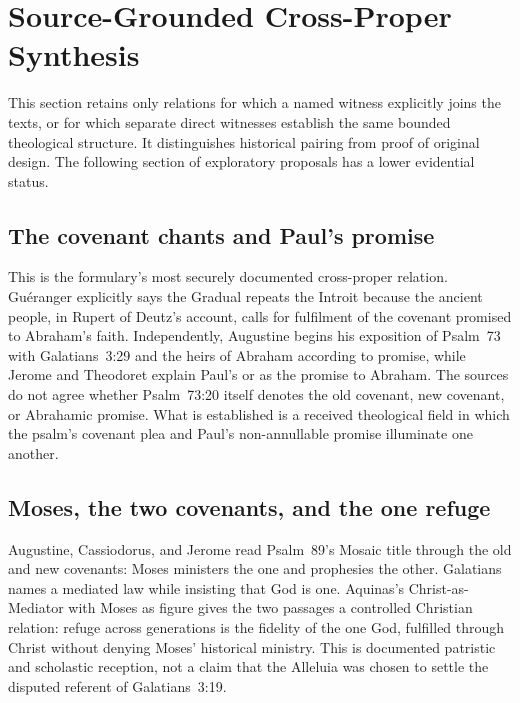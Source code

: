 \sectionguard
\section*{Source-Grounded Cross-Proper Synthesis}

\begin{studyframe}
This section retains only relations for which a named witness explicitly joins
the texts, or for which separate direct witnesses establish the same bounded
theological structure. It distinguishes historical pairing from proof of
original design. The following section of exploratory proposals has a lower
evidential status.
\end{studyframe}

\subsection*{The covenant chants and Paul's promise\enspace{}}

This is the formulary's most securely documented cross-proper relation.
Guéranger explicitly says the Gradual repeats the Introit because the ancient
people, in Rupert of Deutz's account, calls for fulfilment of the covenant
promised to Abraham's faith. Independently, Augustine begins his exposition
of Psalm~73 with Galatians~3:29 and the heirs of Abraham according to promise,
while Jerome and Theodoret explain Paul's  or
 as the promise to Abraham. The sources do not agree whether
Psalm~73:20 itself denotes the old covenant, new covenant, or Abrahamic
promise. What is established is a received theological field in which the
psalm's covenant plea and Paul's non-annullable promise illuminate one another.

\subsection*{Moses, the two covenants, and the one refuge\enspace{}}

Augustine, Cassiodorus, and Jerome read Psalm~89's Mosaic title through the
old and new covenants: Moses ministers the one and prophesies the other.
Galatians names a mediated law while insisting that God is one. Aquinas's
Christ-as-Mediator with Moses as figure gives the two passages a controlled
Christian relation: refuge across generations is the fidelity of the one God,
fulfilled through Christ without denying Moses' historical ministry. This is
documented patristic and scholastic reception, not a claim that the Alleluia
was chosen to settle the disputed referent of Galatians~3:19.

